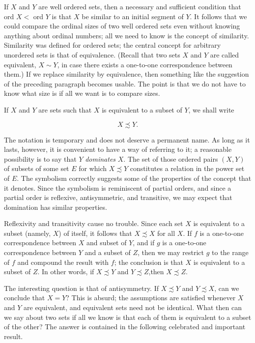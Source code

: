 If $X$ and $Y$ are well ordered sets, then a necessary and sufficient condition that ord $X <$ ord $Y$ is that $X$ be similar to an initial segment of $Y$. It follows that we could compare the ordinal sizes of two well ordered sets even without knowing anything about ordinal numbers; all we need to know is the concept of similarity. Similarity was defined for ordered sets; the central concept for arbitrary unordered sets is that of equivalence. (Recall that two sets $X$ and $Y$ are called equivalent, $X \sim Y$, in case there exists a one-to-one correspondence between them.) If we replace similarity by equivalence, then something like the suggestion of the preceding paragraph becomes usable. The point is that we do not have to know what size is if all we want is to compare sizes. 

If $X$ and $Y$ are sets such that $X$ is equivalent to a subset of $Y$, we shall write 

\begin{equation*}
X \precsim Y. 
\end{equation*}

The notation is temporary and does not deserve a permanent name. As long as it lasts, however, it is convenient to have a way of referring to it; a reasonable possibility is to say that $Y$ \textit{dominates} $X$. The set of those ordered pairs $(X, Y)$ of subsets of some set $E$ for which $X \precsim Y$ constitutes a relation in the power set of $E$. The symbolism correctly suggests some of the properties of the concept that it denotes. Since the symbolism is reminiscent of partial orders, and since a partial order is reflexive, antisymmetric, and transitive, we may expect   that domination has similar properties. 

Reflexivity and transitivity cause no trouble. Since each set $X$ is equivalent to a subset (namely, $X$) of itself, it follows that $X \precsim X$ for all $X$. If $f$ is a one-to-one correspondence between $X$ and subset of $Y$, and if $g$ is a one-to-one correspondence between $Y$ and a subset of $Z$, then we may restrict $g$ to the range of $f$ and compound the result with $f$; the conclusion is that $X$ is equivalent to a subset of $Z$. In other words, if $X \precsim Y$ and  $Y \precsim Z$,then $X \precsim Z$. 

The interesting question is that of antisymmetry. If $X \precsim Y$ and $Y \precsim X$, can we conclude that $X = Y$? This is absurd; the assumptions are satisfied whenever $X$ and $Y$ are equivalent, and equivalent sets need not be identical. What then can we say about two sets if all we know is that each of them is equivalent to a subset of the other? The answer is contained in the following celebrated and important result. 

